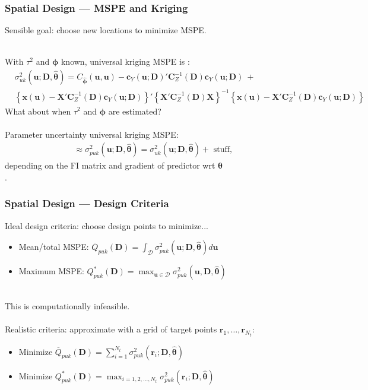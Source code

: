 \documentclass[xcolor=dvipsnames]{beamer}
\begin{document}
\begin{frame}
\frametitle{Spatial Design --- MSPE and Kriging}
Sensible goal: choose new locations to minimize MSPE. \\~\\

\pause

With $\tau^2$ and $\bm{\phi}$ known, universal kriging MSPE is {\footnotesize \citep{cressie2011statistics}:}
{\footnotesize
\begin{align*}
& \sigma_{uk}^2(\bm{u};\bm{D}, \widehat{\bm{\theta}})=C_{\widehat{\bm{\phi}}}(\bm{u}, \bm{u}) - \bm{c}_Y(\bm{u};\bm{D})'\bm{C}_Z^{-1}(\bm{D})\bm{c}_Y(\bm{u};\bm{D}) \ + \\
& \left\{\bm{x}(\bm{u})  - \bm{X}'\bm{C}_Z^{-1}(\bm{D})\bm{c}_Y(\bm{u};\bm{D})\right\}'\left\{\bm{X}'\bm{C}_Z^{-1}(\bm{D})\bm{X}\right\}^{-1}\left\{\bm{x}(\bm{u})  - \bm{X}'\bm{C}_Z^{-1}(\bm{D})\bm{c}_Y(\bm{u};\bm{D})\right\}
\end{align*}
}
\pause
What about when $\tau^2$ and $\bm{\phi}$ are estimated? \pause\\~\\

Parameter uncertainty universal kriging MSPE:
\begin{align*}
\approx \sigma^2_{puk}(\bm{u};\bm{D},\widehat{\bm{\theta}}) = \sigma^2_{uk}(\bm{u};\bm{D},\widehat{\bm{\theta}}) + \mbox{ stuff, }
\end{align*}
depending on the FI matrix and gradient of predictor wrt $\bm{\theta}$\\
\citep{zimmerman1992mean,abt1999estimating}.
\end{frame}

\begin{frame}
\frametitle{Spatial Design --- Design Criteria}
Ideal design criteria: choose design points to minimize...
\begin{itemize}
\item Mean/total MSPE: $\overline{Q}_{puk}(\bm{D}) = \int_{\mathcal{D}}\sigma_{puk}^2(\bm{u};\bm{D},\widehat{\bm{\theta}})d\bm{u}$
\item Maximum MSPE: $Q^*_{puk}(\bm{D}) = \max_{\bm{u}\in\mathcal{D}}\sigma_{puk}^2(\bm{u},\bm{D},\widehat{\bm{\theta}})$\\~\\
\end{itemize}

\pause

This is computationally infeasible. \\~\\

Realistic criteria: approximate with a grid of target points $\bm{r}_1,\dots,\bm{r}_{N_t}$:
\begin{itemize}
\item Minimize $\overline{Q}_{puk}(\bm{D}) = \sum_{i=1}^{N_t}\sigma_{puk}^2(\bm{r}_i;\bm{D},\widehat{\bm{\theta}})$
\item Minimize $Q_{puk}^*(\bm{D}) = \max_{i=1,2,\dots,N_t}\sigma_{puk}^2(\bm{r}_i;\bm{D},\widehat{\bm{\theta}})$
\end{itemize}

\end{frame}
\end{document}
